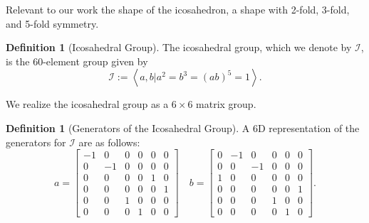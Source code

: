 \documentclass[a4paper,10pt]{article}
\theoremstyle{plain}
\theoremstyle{definition}
\newtheorem{Definition}[Theorem]{Definition}
\theoremstyle{remark}
\newcommand{\generatedby}[1]{\left\langle#1\right\rangle}
\begin{document}

Relevant to our work the shape of the icosahedron, a shape with 2-fold, 3-fold, and 5-fold symmetry.
\begin{Definition}[Icosahedral Group]
	The icosahedral group, which we denote by \(\mathcal{I}\), is the 60-element group given by \[\mathcal{I} := \generatedby{a, b | a^2 = b^3 = (ab)^5 = 1}.\]
\end{Definition}
\noindent We realize the icosahedral group as a \( 6 \times 6 \) matrix group.
\begin{Definition}[Generators of the Icosahedral Group]
	A 6D representation of the generators for \(\mathcal{I}\) are as follows:
	\[a = \begin{bmatrix}
		-1 & 0  & 0 & 0 & 0 & 0 \\
		0  & -1 & 0 & 0 & 0 & 0 \\
		0  & 0  & 0 & 0 & 1 & 0 \\
		0  & 0  & 0 & 0 & 0 & 1 \\
		0  & 0  & 1 & 0 & 0 & 0 \\
		0  & 0  & 0 & 1 & 0 & 0
	\end{bmatrix} \quad b = \begin{bmatrix}
		0 & -1 & 0  & 0 & 0 & 0 \\
		0 & 0  & -1 & 0 & 0 & 0 \\
		1 & 0  & 0  & 0 & 0 & 0 \\
		0 & 0  & 0  & 0 & 0 & 1 \\
		0 & 0  & 0  & 1 & 0 & 0 \\
		0 & 0  & 0  & 0 & 1 & 0
	\end{bmatrix}.\]
\end{Definition}
\end{document}
